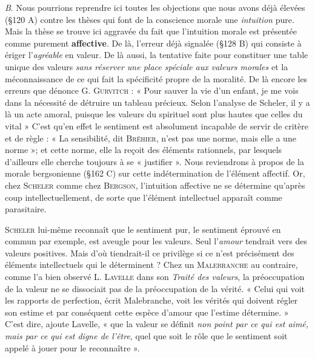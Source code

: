 {\it B}. Nous pourrions reprendre ici toutes les objections que nous
avons déjà élevées (\S 120 A) contre les thèses qui font de la conscience
morale une {\it intuition} pure. Mais la thèse se trouve ici aggravée du fait
que l'intuition morale est présentée comme purement {\bf affective}. De
là, l'erreur déjà signalée (\S 128 B) qui consiste à ériger l’{\it agréable} en
valeur. De là aussi, la tentative faite pour constituer une table unique
des valeurs {\it sans réserver une place spéciale aux valeurs morales} et la
méconnaissance de ce qui fait la spécificité propre de la moralité.
De là encore les erreurs que dénonce G. \textsc{Gurvitch} : « Pour sauver
la vie d’un enfant, je me vois dans la nécessité de détruire un tableau
précieux. Selon l’analyse de Scheler, il y a là un acte amoral, puisque
les valeurs du spirituel sont plus hautes que celles du vital » C'est
qu’en effet le sentiment est absolument incapable de servir de critère
et de règle : « La sensibilité, dit \textsc{Bréhier}, n’est pas une norme, mais
elle a une norme »; et cette norme, elle la reçoit des éléments rationnels,
par lesquels d’ailleurs elle cherche toujours à se « justifier ».
Nous reviendrons à propos de la morale bergsonienne (\S 162 C)
sur cette indétermination de l’élément affectif. Or, chez \textsc{Scheler}
comme chez \textsc{Bergson}, l’intuition affective ne se détermine qu'après
coup intellectuellement, de sorte que l’élément intellectuel apparaît
comme parasitaire.

\textsc{Scheler} lui-même reconnaît que le sentiment pur, le sentiment
éprouvé en commun par exemple, est aveugle pour les valeurs. Seul
l'{\it amour} tendrait vers des valeurs positives. Mais d’où tiendrait-il
ce privilège si ce n’est précisément des éléments intellectuels qui le
déterminent ? Chez un \textsc{Malebranche} au contraire, comme l’a bien
observé L. \textsc{Lavelle} dans son {\it Traité des valeurs}, la préoccupation
de la valeur ne se dissociait pas de la préoccupation de la vérité.
« Celui qui voit les rapports de perfection, écrit Malebranche, voit
les vérités qui doivent régler son estime et par conséquent cette espèce
d'amour que l'estime détermine. » C’est dire, ajoute Lavelle, « que la
valeur se définit {\it non point par ce qui est aimé, mais par ce qui est
digne de l'être}, quel que soit le rôle que le sentiment soit appelé à
jouer pour le reconnaître ».

